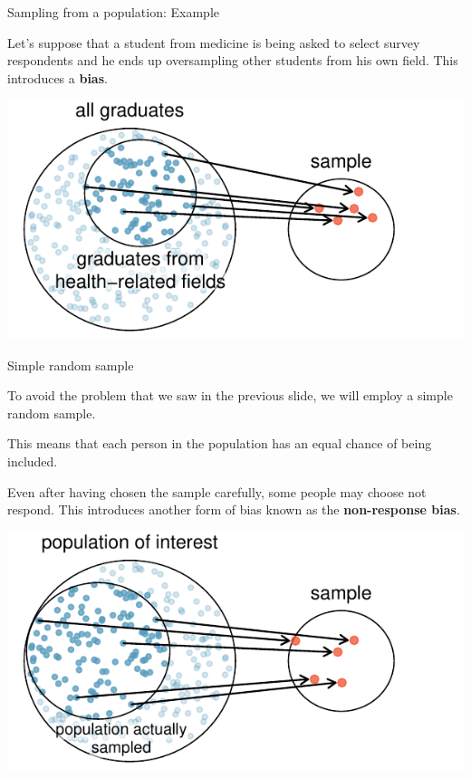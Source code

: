 \documentclass[notes,11pt, aspectratio=169]{beamer}
\begin{document}
\begin{frame}{Sampling from a population: Example}

Let's suppose that a student from medicine is being asked to select survey respondents and he ends up oversampling other students from his own field. This introduces a \textbf{bias}.
\begin{center}
\includegraphics[scale=0.8]{graphs/popToSubsampleGraduates}
\end{center}

\end{frame}


\begin{frame}{Simple random sample}

To avoid the problem that we saw in the previous slide, we will employ a simple random sample. \\

\vspace{5mm}

\pause

This means that each person in the population has an equal chance of being included. 

\vspace{5mm}
\pause

Even after having chosen the sample carefully, some people may choose not respond. This introduces another form of bias known as the \textbf{non-response bias}.
\begin{center}
\includegraphics[scale=0.8]{graphs/surveySample}
\end{center}

\end{frame}
\end{document}
